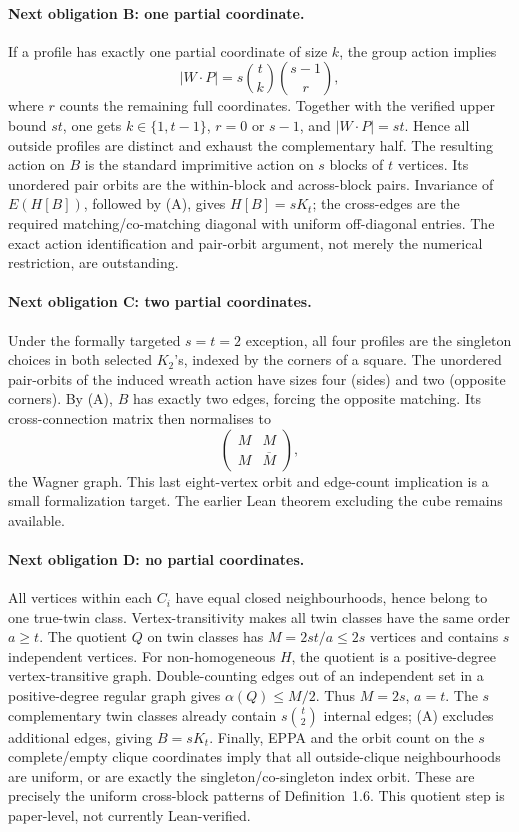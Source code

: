 \documentclass[11pt,a4paper]{article}
\begin{document}
\paragraph{Next obligation B: one partial coordinate.}
If a profile has exactly one partial coordinate of size \(k\),
the group action implies
\[
 |W\cdot P|=s\binom tk\binom{s-1}{r},
\]
where \(r\) counts the remaining full coordinates.
Together with the verified upper bound \(st\), one gets
\(k\in\{1,t-1\}\), \(r=0\) or \(s-1\), and
\(|W\cdot P|=st\). Hence all outside profiles are distinct
and exhaust the complementary half.
The resulting action on \(B\) is the standard imprimitive
action on \(s\) blocks of \(t\) vertices.
Its unordered pair orbits are the within-block
and across-block pairs. Invariance of \(E(H[B])\),
followed by (A), gives \(H[B]=sK_t\);
the cross-edges are the required matching/co-matching
diagonal with uniform off-diagonal entries.
The exact action identification and pair-orbit argument,
not merely the numerical restriction, are outstanding.

\paragraph{Next obligation C: two partial coordinates.}
Under the formally targeted \(s=t=2\) exception,
all four profiles are the singleton choices in both
selected \(K_2\)'s, indexed by the corners of a square.
The unordered pair-orbits of the induced wreath action
have sizes four (sides) and two (opposite corners).
By (A), \(B\) has exactly two edges, forcing the opposite
matching. Its cross-connection matrix then normalises to
\[
 \begin{pmatrix}
 M&M\\M&\overline M
 \end{pmatrix},
\]
the Wagner graph. This last eight-vertex orbit and
edge-count implication is a small formalization target.
The earlier Lean theorem excluding the cube remains available.

\paragraph{Next obligation D: no partial coordinates.}
All vertices within each \(C_i\) have equal closed
neighbourhoods, hence belong to one true-twin class.
Vertex-transitivity makes all twin classes have
the same order \(a\ge t\). The quotient \(Q\)
on twin classes has \(M=2st/a\le2s\) vertices
and contains \(s\) independent vertices.
For non-homogeneous \(H\), the quotient is
a positive-degree vertex-transitive graph.
Double-counting edges out of an independent set
in a positive-degree regular graph gives
\(\alpha(Q)\le M/2\).
Thus \(M=2s\), \(a=t\).
The \(s\) complementary twin classes already contain
\(s\binom t2\) internal edges; (A) excludes additional
edges, giving \(B=sK_t\).
Finally, EPPA and the orbit count on the
\(s\) complete/empty clique coordinates imply
that all outside-clique neighbourhoods are uniform,
or are exactly the singleton/co-singleton index orbit.
These are precisely the uniform cross-block patterns
of Definition~1.6. This quotient step is paper-level,
not currently Lean-verified.
\end{document}
